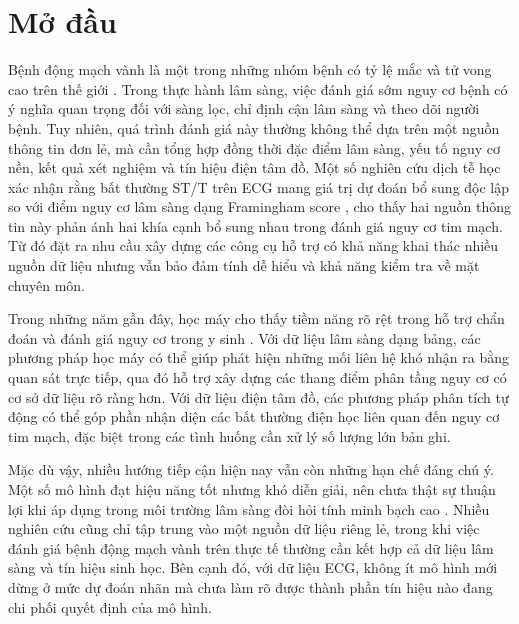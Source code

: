\clearpage
{}

\chapter*{\Large \textbf{Mở đầu}}
\setcounter{figure}{0}
\setcounter{table}{0}
\renewcommand{\thefigure}{0.\arabic{figure}}
\renewcommand{\thetable}{0.\arabic{table}}

\blocksep

Bệnh động mạch vành là một trong những nhóm bệnh có tỷ lệ mắc và tử vong cao trên thế giới \cite{Libby2011}. Trong thực hành lâm sàng, việc đánh giá sớm nguy cơ bệnh có ý nghĩa quan trọng đối với sàng lọc, chỉ định cận lâm sàng và theo dõi người bệnh. Tuy nhiên, quá trình đánh giá này thường không thể dựa trên một nguồn thông tin đơn lẻ, mà cần tổng hợp đồng thời đặc điểm lâm sàng, yếu tố nguy cơ nền, kết quả xét nghiệm và tín hiệu điện tâm đồ. Một số nghiên cứu dịch tễ học xác nhận rằng bất thường ST/T trên ECG mang giá trị dự đoán bổ sung độc lập so với điểm nguy cơ lâm sàng dạng Framingham score \cite{StromMoller2007, Badheka2013, Muccini2021}, cho thấy hai nguồn thông tin này phản ánh hai khía cạnh bổ sung nhau trong đánh giá nguy cơ tim mạch. Từ đó đặt ra nhu cầu xây dựng các công cụ hỗ trợ có khả năng khai thác nhiều nguồn dữ liệu nhưng vẫn bảo đảm tính dễ hiểu và khả năng kiểm tra về mặt chuyên môn.

\blocksep

Trong những năm gần đây, học máy cho thấy tiềm năng rõ rệt trong hỗ trợ chẩn đoán và đánh giá nguy cơ trong y sinh \cite{Krittanawong2017}. Với dữ liệu lâm sàng dạng bảng, các phương pháp học máy có thể giúp phát hiện những mối liên hệ khó nhận ra bằng quan sát trực tiếp, qua đó hỗ trợ xây dựng các thang điểm phân tầng nguy cơ có cơ sở dữ liệu rõ ràng hơn. Với dữ liệu điện tâm đồ, các phương pháp phân tích tự động có thể góp phần nhận diện các bất thường điện học liên quan đến nguy cơ tim mạch, đặc biệt trong các tình huống cần xử lý số lượng lớn bản ghi.

\blocksep

Mặc dù vậy, nhiều hướng tiếp cận hiện nay vẫn còn những hạn chế đáng chú ý. Một số mô hình đạt hiệu năng tốt nhưng khó diễn giải, nên chưa thật sự thuận lợi khi áp dụng trong môi trường lâm sàng đòi hỏi tính minh bạch cao \cite{Lipton2018, Rudin2019}. Nhiều nghiên cứu cũng chỉ tập trung vào một nguồn dữ liệu riêng lẻ, trong khi việc đánh giá bệnh động mạch vành trên thực tế thường cần kết hợp cả dữ liệu lâm sàng và tín hiệu sinh học. Bên cạnh đó, với dữ liệu ECG, không ít mô hình mới dừng ở mức dự đoán nhãn mà chưa làm rõ được thành phần tín hiệu nào đang chi phối quyết định của mô hình.

